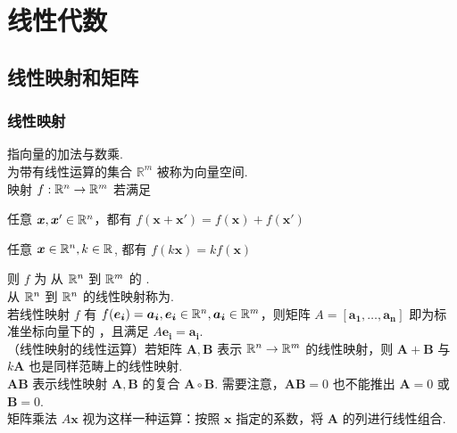 \documentclass[./main.tex]{subfiles}
\begin{document}
\chapter{线性代数}

\section{线性映射和矩阵}

\subsection{线性映射}

指向量的加法与数乘. \\

为带有线性运算的集合 $\mathbb{R}^m$ 被称为向量空间. \\

映射 $f:\mathbb{R}^{n}\rightarrow\mathbb{R}^{m}$ 若满足
\begin{enumerate*}
    \item 任意 $\bm{x},\bm{x}'\in\mathbb{R}^{n}$，都有 $f(\bm{x}+\bm{x'})=f(\bm{x})+f(\bm{x'})$
    \item 任意 $\bm{x}\in\mathbb{R}^{n},k\in\mathbb{R}^{}$, 都有 $f(k\bm{x})=kf(\bm{x})$
\end{enumerate*}
则 $f$ 为 从 $\mathbb{R}^{n}$ 到 $\mathbb{R}^{m}$ 的 . \\

从 $\mathbb{R}^{n}$ 到 $\mathbb{R}^{n}$ 的线性映射称为.\\

若线性映射 $f$ 有 $f(\bm{e_i})=\bm{a_i},\bm{e_i}\in\mathbb{R}^{n}, \bm{a_i}\in\mathbb{R}^{m}$，则矩阵 $A=[\bm{a_1},\dots,\bm{a_n}]$ 即为标准坐标向量下的 ，且满足 $A\bm{e_i}=\bm{a_i}$. \\

（线性映射的线性运算）若矩阵 $\bm{A},\bm{B}$ 表示 $\mathbb{R}^{n}\rightarrow\mathbb{R}^{m}$ 的线性映射，则 $\bm{A}+\bm{B}$ 与 $k\bm{A}$ 也是同样范畴上的线性映射. \\

$\bm{AB}$ 表示线性映射 $\bm{A},\bm{B}$ 的复合 $\bm{A}\circ\bm{B}$. 需要注意，$\bm{AB}=0$ 也不能推出 $\bm{A}=0$ 或 $\bm{B}=0$. \\

矩阵乘法 $A\bm{x}$ 视为这样一种运算：按照 $\bm{x}$ 指定的系数，将 $\bm{A}$ 的列进行线性组合. \\
\end{document}
